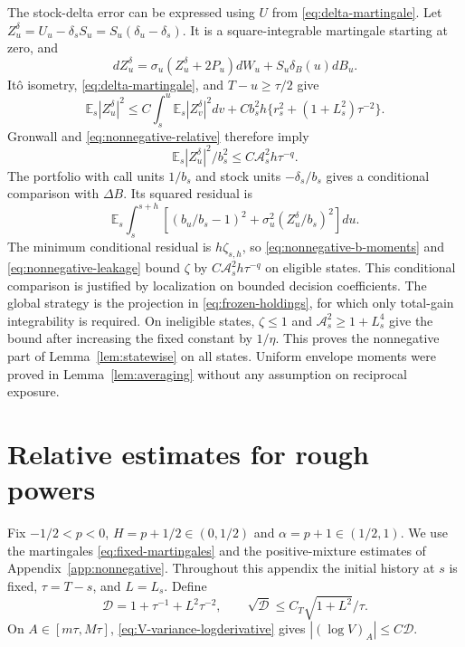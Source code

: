 \documentclass[11pt,a4paper]{amsart}
\theoremstyle{plain}
\theoremstyle{definition}
\theoremstyle{remark}
\newcommand{\EE}{\mathbb{E}}
\newcommand{\Es}{\EE_s}
\begin{document}
The stock-delta error can be expressed using $U$ from \eqref{eq:delta-martingale}. Let
$Z_u^\delta=U_u-\delta_sS_u=S_u(\delta_u-\delta_s)$. It is a square-integrable martingale starting at zero, and
\begin{equation}\label{eq:Zdelta-sde}
 dZ_u^\delta=\sigma_u(Z_u^\delta+2P_u)dW_u
                  +S_u\delta_B(u)dB_u.
\end{equation}
It\^o isometry, \eqref{eq:delta-martingale}, and $T-u\ge\tau/2$ give
\[
 \Es|Z_u^\delta|^2\le C\int_s^u\Es|Z_v^\delta|^2dv
       +Cb_s^2h\{r_s^2+(1+L_s^2)\tau^{-2}\}.
\]
Gronwall and \eqref{eq:nonnegative-relative} therefore imply
\begin{equation}\label{eq:nonnegative-leakage}
 \Es|Z_u^\delta|^2/b_s^2\le C\mathcal A_s^2h\tau^{-q}.
\end{equation}
The portfolio with call units $1/b_s$ and stock units $-\delta_s/b_s$ gives a conditional comparison with $\Delta B$. Its squared residual is
\begin{equation}\label{eq:conditional-comparison}
 \Es\int_s^{s+h}\left[(b_u/b_s-1)^2+
                  \sigma_u^2(Z_u^\delta/b_s)^2\right]du.
\end{equation}
The minimum conditional residual is $h\zeta_{s,h}$, so \eqref{eq:nonnegative-b-moments} and \eqref{eq:nonnegative-leakage} bound $\zeta$ by $C\mathcal A_s^2h\tau^{-q}$ on eligible states. This conditional comparison is justified by localization on bounded decision coefficients. The global strategy is the projection in \eqref{eq:frozen-holdings}, for which only total-gain integrability is required. On ineligible states, $\zeta\le1$ and $\mathcal A_s^2\ge1+L_s^4$ give the bound after increasing the fixed constant by $1/\eta$. This proves the nonnegative part of Lemma~\ref{lem:statewise} on all states. Uniform envelope moments were proved in Lemma~\ref{lem:averaging} without any assumption on reciprocal exposure.

\section{Relative estimates for rough powers}\label{app:rough}

Fix $-1/2<p<0$, $H=p+1/2\in(0,1/2)$ and $\alpha=p+1\in(1/2,1)$. We use the martingales \eqref{eq:fixed-martingales} and the positive-mixture estimates of Appendix~\ref{app:nonnegative}. Throughout this appendix the initial history at $s$ is fixed, $\tau=T-s$, and $L=L_s$. Define
\begin{equation}\label{eq:rough-D}
 \mathscr D=1+\tau^{-1}+L^2\tau^{-2},
 \qquad \sqrt{\mathscr D}\le C_T\sqrt{1+L^2}/\tau.
\end{equation}
On $A\in[m\tau,M\tau]$, \eqref{eq:V-variance-logderivative} gives $|(\log V)_A|\le C\mathscr D$.
\end{document}
